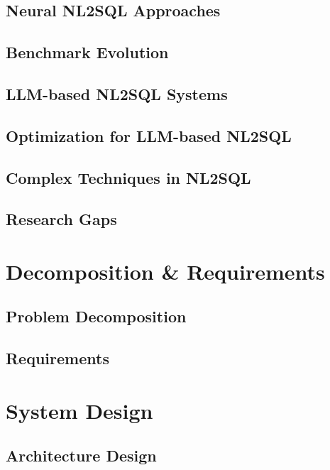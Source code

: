 \documentclass{article}
\begin{document}
\subsection{Neural NL2SQL Approaches}

\subsection{Benchmark Evolution}

\subsection{LLM-based NL2SQL Systems}

\subsection{Optimization for LLM-based NL2SQL}

\subsection{Complex Techniques in NL2SQL}

\subsection{Research Gaps}

\newpage

\section{Decomposition \& Requirements}

\subsection{Problem Decomposition}

\subsection{Requirements}

\section{System Design}

\subsection{Architecture Design}
\end{document}
